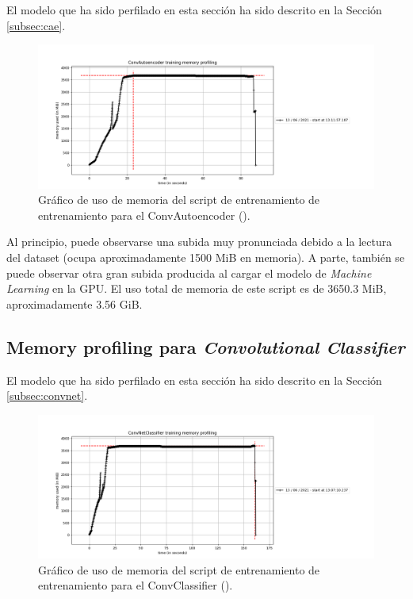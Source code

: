 El modelo que ha sido perfilado en esta sección ha sido descrito en la Sección \ref{subsec:cae}.

\begin{figure}[H]
	\includegraphics[width=1.\linewidth]{imagenes/06_Experimentacion/cae.png}
	\centering
	\caption{Gráfico de uso de memoria del script de entrenamiento de entrenamiento para el ConvAutoencoder ().}
\end{figure}

Al principio, puede observarse una subida muy pronunciada debido a la lectura del dataset (ocupa aproximadamente 1500 MiB en memoria). A parte, también se puede observar otra gran subida producida al cargar el modelo de \textit{Machine Learning} en la GPU. El uso total de memoria de este script es de 3650.3 MiB, aproximadamente 3.56 GiB.\\

\subsection{Memory profiling para \textit{Convolutional Classifier}}

El modelo que ha sido perfilado en esta sección ha sido descrito en la Sección \ref{subsec:convnet}.

\begin{figure}[H]
	\includegraphics[width=1.\linewidth]{imagenes/06_Experimentacion/convnet.png}
	\centering
	\caption{Gráfico de uso de memoria del script de entrenamiento de entrenamiento para el ConvClassifier ().}
\end{figure}

